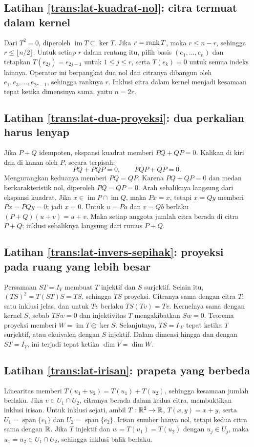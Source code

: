 \subsection*{Latihan \ref{trans:lat-kuadrat-nol}: citra termuat dalam kernel}
Dari $T^2=0$, diperoleh $\operatorname{im}T\subseteq\ker T$.
Jika $r=\operatorname{rank} T$, maka $r\le n-r$, sehingga $r\le\lfloor n/2\rfloor$.
Untuk setiap $r$ dalam rentang itu, pilih basis $(e_1,\ldots,e_n)$
dan tetapkan $T(e_{2j})=e_{2j-1}$ untuk $1\le j\le r$,
serta $T(e_k)=0$ untuk semua indeks lainnya.
Operator ini berpangkat dua nol dan citranya dibangun oleh
$e_1,e_3,\ldots,e_{2r-1}$, sehingga ranknya $r$.
Inklusi citra dalam kernel menjadi kesamaan tepat ketika
dimensinya sama, yaitu $n=2r$.

\subsection*{Latihan \ref{trans:lat-dua-proyeksi}: dua perkalian harus lenyap}
Jika $P+Q$ idempoten, ekspansi kuadrat memberi $PQ+QP=0$.
Kalikan di kiri dan di kanan oleh $P$, secara terpisah:
\[
    PQ+PQP=0,\qquad PQP+QP=0.
\]
Mengurangkan keduanya memberi $PQ=QP$.
Karena $PQ+QP=0$ dan medan berkarakteristik nol, diperoleh
$PQ=QP=0$. Arah sebaliknya langsung dari ekspansi kuadrat.
Jika $x\in\operatorname{im}P\cap\operatorname{im}Q$, maka
$Px=x$, tetapi $x=Qy$ memberi $Px=PQy=0$; jadi $x=0$.
Untuk $u=Pa$ dan $v=Qb$ berlaku $(P+Q)(u+v)=u+v$.
Maka setiap anggota jumlah citra berada di citra $P+Q$;
inklusi sebaliknya langsung dari rumus $P+Q$.

\subsection*{Latihan \ref{trans:lat-invers-sepihak}: proyeksi pada ruang yang lebih besar}
Persamaan $ST=I_V$ membuat $T$ injektif dan $S$ surjektif.
Selain itu, $(TS)^2=T(ST)S=TS$, sehingga $TS$ proyeksi.
Citranya sama dengan citra $T$: satu inklusi jelas, dan
untuk $Tv$ berlaku $TS(Tv)=Tv$.
Kernelnya sama dengan kernel $S$, sebab $TSw=0$ dan injektivitas
$T$ mengakibatkan $Sw=0$.
Teorema proyeksi memberi $W=\operatorname{im}T\oplus\ker S$.
Selanjutnya, $TS=I_W$ tepat ketika $T$ surjektif, atau ekuivalen
dengan $S$ injektif. Dalam dimensi hingga dan dengan $ST=I_V$,
ini terjadi tepat ketika $\dim V=\dim W$.

\subsection*{Latihan \ref{trans:lat-irisan}: prapeta yang berbeda}
Linearitas memberi $T(u_1+u_2)=T(u_1)+T(u_2)$, sehingga
kesamaan jumlah berlaku. Jika $v\in U_1\cap U_2$, citranya
berada dalam kedua citra, membuktikan inklusi irisan.
Untuk inklusi sejati, ambil $T:\mathbb{R}^2\to\mathbb{R}$,
$T(x,y)=x+y$, serta $U_1=\operatorname{span}\{e_1\}$ dan
$U_2=\operatorname{span}\{e_2\}$.
Irisan sumber hanya nol, tetapi kedua citra sama dengan $\mathbb{R}$.
Jika $T$ injektif dan $w=T(u_1)=T(u_2)$ dengan $u_j\in U_j$,
maka $u_1=u_2\in U_1\cap U_2$, sehingga inklusi balik berlaku.

